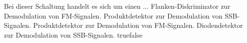     {Bei dieser Schaltung handelt es sich um einen ...}
    {Flanken-Diskriminator zur Demodulation von FM-Signalen.}
    {Produktdetektor zur Demodulation von SSB-Signalen.}
    {Produktdetektor zur Demodulation von FM-Signalen.}
    {Diodendetektor zur Demodulation von SSB-Signalen.}
    {true}{false}